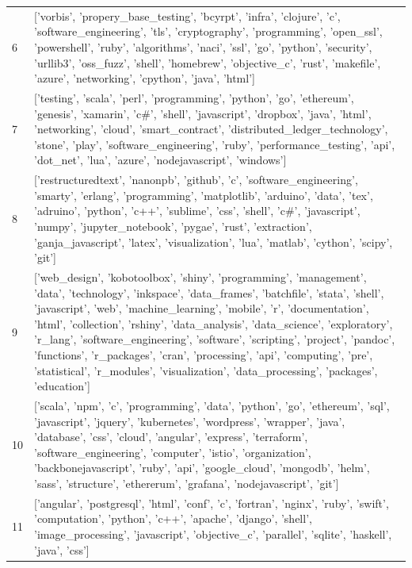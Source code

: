 \begin{center}
\begin{longtable}{|p{1.5cm}|p{12.5cm}|}
            6 & ['vorbis', 'propery\_base\_testing', 'bcyrpt', 'infra', 'clojure', 'c', 'software\_engineering', 'tls', 'cryptography', 'programming', 'open\_ssl', 'powershell', 'ruby', 'algorithms', 'naci', 'ssl', 'go', 'python', 'security', 'urllib3', 'oss\_fuzz', 'shell', 'homebrew', 'objective\_c', 'rust', 'makefile', 'azure', 'networking', 'cpython', 'java', 'html']  \\ 
            7 & ['testing', 'scala', 'perl', 'programming', 'python', 'go', 'ethereum', 'genesis', 'xamarin', 'c\#', 'shell', 'javascript', 'dropbox', 'java', 'html', 'networking', 'cloud', 'smart\_contract', 'distributed\_ledger\_technology', 'stone', 'play', 'software\_engineering', 'ruby', 'performance\_testing', 'api', 'dot\_net', 'lua', 'azure', 'nodejavascript', 'windows']  \\ 
            8 & ['restructuredtext', 'nanonpb', 'github', 'c', 'software\_engineering', 'smarty', 'erlang', 'programming', 'matplotlib', 'arduino', 'data', 'tex', 'adruino', 'python', 'c++', 'sublime', 'css', 'shell', 'c\#', 'javascript', 'numpy', 'jupyter\_notebook', 'pygae', 'rust', 'extraction', 'ganja\_javascript', 'latex', 'visualization', 'lua', 'matlab', 'cython', 'scipy', 'git']  \\ 
            9 & ['web\_design', 'kobotoolbox', 'shiny', 'programming', 'management', 'data', 'technology', 'inkspace', 'data\_frames', 'batchfile', 'stata', 'shell', 'javascript', 'web', 'machine\_learning', 'mobile', 'r', 'documentation', 'html', 'collection', 'rshiny', 'data\_analysis', 'data\_science', 'exploratory', 'r\_lang', 'software\_engineering', 'software', 'scripting', 'project', 'pandoc', 'functions', 'r\_packages', 'cran', 'processing', 'api', 'computing', 'pre', 'statistical', 'r\_modules', 'visualization', 'data\_processing', 'packages', 'education']  \\ 
            10 & ['scala', 'npm', 'c', 'programming', 'data', 'python', 'go', 'ethereum', 'sql', 'javascript', 'jquery', 'kubernetes', 'wordpress', 'wrapper', 'java', 'database', 'css', 'cloud', 'angular', 'express', 'terraform', 'software\_engineering', 'computer', 'istio', 'organization', 'backbonejavascript', 'ruby', 'api', 'google\_cloud', 'mongodb', 'helm', 'sass', 'structure', 'ethererum', 'grafana', 'nodejavascript', 'git']  \\ 
            11 & ['angular', 'postgresql', 'html', 'conf', 'c', 'fortran', 'nginx', 'ruby', 'swift', 'computation', 'python', 'c++', 'apache', 'django', 'shell', 'image\_processing', 'javascript', 'objective\_c', 'parallel', 'sqlite', 'haskell', 'java', 'css']  \\ 

\end{longtable}
\end{center}
